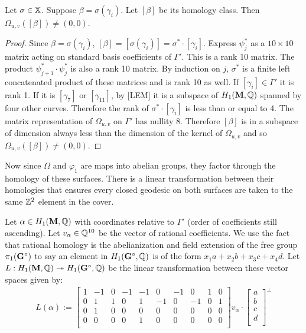\documentclass[a4paper, 11pt]{article}
\def\bM{\mathbf{M}}
\begin{document}
\begin{thm}
Let $\sigma\in\mathbb{X}$. Suppose $\beta=\sigma(\gamma_i)$. Let $[\beta]$ be its homology class. Then $\Omega_{u,v}([\beta])\neq (0,0)$.
\begin{proof}
Since $\beta=\sigma(\gamma_i)$, $[\beta]=[\sigma(\gamma_i)]=\sigma^*\cdot[\gamma_i]$. Express $\psi_j^*$ as a $10\times10$ matrix acting on standard basis coefficients of $\Gamma'$. This is a rank 10 matrix. The product $\psi_{j+1}^*\cdot\psi_j^*$ is also a rank 10 matrix. By induction on $j$, $\sigma^*$ is a finite left concatenated product of these matrices and is rank 10 as well. If $[\gamma_i]\in\Gamma'$ it is rank 1. If it is $[\gamma_7]$ or $[\gamma_{11}]$, by [LEM] it is a subspace of $H_1(\bM,\QQ)$ spanned by four other curves. Therefore the rank of $\sigma^*\cdot[\gamma_i]$ is less than or equal to 4. The matrix representation of $\Omega_{u,v}$ on $\Gamma'$ has nullity 8. Therefore $[\beta]$ is in a subspace of dimension always less than the dimension of the kernel of $\Omega_{u,v}$ and so $\Omega_{u,v}([\beta])\neq (0,0)$.
\end{proof}
\end{thm}

Now since $\Omega$ and $\varphi_1$ are maps into abelian groups, they factor through the homology of these surfaces. There is a linear transformation between their homologies that ensures every closed geodesic on both surfaces are taken to the same $\mathbb{Z}^2$ element in the cover.



\begin{Def}
Let $\alpha\in H_1(\bM, \QQ)$ with coordinates relative to $\Gamma'$ (order of coefficients still ascending). Let $v_\alpha\in\mathbb{Q}^{10}$ be the vector of rational coefficients. We use the fact that rational homology is the abelianization and field extension of the free group $\pi_1(\mathbf{G}^\circ)$ to say an element in $H_1(\mathbf{G}^\circ,\mathbb{Q})$ is of the form $x_1a+x_2b+x_3c+x_4d$. Let $L:H_1(\bM,\QQ)\twoheadrightarrow H_1(\bGs,\QQ)$ be the linear transformation between these vector spaces given by:
\begin{align}
L(\alpha):=\left[\begin{matrix}
1 & -1 & 0 & -1 & -1 & 0 & -1 & 0 & 1 & 0\\
0 & 1 & 1 & 0 & 1 & -1 & 0 & -1 & 0 & 1\\
0 & 1 & 0 & 0 & 0 & 0 & 0 & 0 & 0 & 0\\
0 & 0 & 0 & 0 & 1 & 0 & 0 & 0 & 0 & 0\\
\end{matrix}\right]v_{\alpha}\cdot \left[\begin{matrix}
a \\ b \\ c\\ d\\
\end{matrix}\right]^{\perp}
\end{align}
\end{Def}
\end{document}
